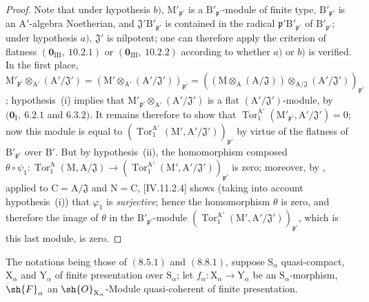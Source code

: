 \begin{proof}
Note that under hypothesis $b)$, $\mathrm{M}'_{\mathfrak{p}'}$ is a $\mathrm{B}'_{\mathfrak{p}'}$-module of finite type, $\mathrm{B}'_{\mathfrak{p}'}$ is an $\mathrm{A}'$-algebra Noetherian, and $\mathfrak{J}'\mathrm{B}'_{\mathfrak{p}'}$ is contained in the radical $\mathfrak{p}'\mathrm{B}'_{\mathfrak{p}'}$ of $\mathrm{B}'_{\mathfrak{p}'}$; under hypothesis $a)$, $\mathfrak{J}'$ is nilpotent; one can therefore apply the criterion of flatness $(\mathbf{0}_{\mathrm{III}},~10.2.1)$ or $(\mathbf{0}_{\mathrm{III}},~10.2.2)$ according to whether $a)$ or $b)$ is verified. In the first place, $\mathrm{M}'_{\mathfrak{p}'}\otimes_{\mathrm{A}'}(\mathrm{A}'/\mathfrak{J}')=(\mathrm{M}'\otimes_{\mathrm{A}'}(\mathrm{A}'/\mathfrak{J}'))_{\mathfrak{p}'}=((\mathrm{M}\otimes_\mathrm{A}(\mathrm{A}/\mathfrak{J}))\otimes_{\mathrm{A}/\mathfrak{J}}(\mathrm{A}'/\mathfrak{J}'))_{\mathfrak{p}'}$; hypothesis~(i) implies that $\mathrm{M}'_{\mathfrak{p}'}\otimes_{\mathrm{A}'}(\mathrm{A}'/\mathfrak{J}')$ is a flat $(\mathrm{A}'/\mathfrak{J}')$-module, by $(\mathbf{0}_\mathrm{I},~6.2.1$ and $6.3.2)$. It remains therefore to show that $\operatorname{Tor}_1^{\mathrm{A}'}(\mathrm{M}'_{\mathfrak{p}'},\mathrm{A}'/\mathfrak{J}')=0$; now this module is equal to $(\operatorname{Tor}_1^{\mathrm{A}'}(\mathrm{M}',\mathrm{A}'/\mathfrak{J}'))_{\mathfrak{p}'}$ by virtue of the flatness of $\mathrm{B}'_{\mathfrak{p}'}$ over $\mathrm{B}'$. But by hypothesis~(ii), the homomorphism composed $\theta\circ\psi_1:\operatorname{Tor}_1^\mathrm{A}(\mathrm{M},\mathrm{A}/\mathfrak{J})\to(\operatorname{Tor}_1^{\mathrm{A}'}(\mathrm{M}',\mathrm{A}'/\mathfrak{J}'))_{\mathfrak{p}'}$ is zero; moreover, by , applied to $\mathrm{C}=\mathrm{A}/\mathfrak{J}$ and $\mathrm{N}=\mathrm{C}$, [IV.11.2.4] shows (taking into account hypothesis~(i)) that $\varphi_1$ is \emph{surjective}; hence the homomorphism $\theta$ is zero, and therefore the image of $\theta$ in the $\mathrm{B}'_{\mathfrak{p}'}$-module $(\operatorname{Tor}_1^{\mathrm{A}'}(\mathrm{M}',\mathrm{A}'/\mathfrak{J}'))_{\mathfrak{p}'}$, which is this last module, is zero.
\end{proof}

\begin{theorem}[11.2.6]
\label{IV.11.2.6}
The notations being those of $(8.5.1)$ and $(8.8.1)$, suppose $\mathrm{S}_\alpha$ quasi-compact, $\mathrm{X}_\alpha$ and $\mathrm{Y}_\alpha$ of finite presentation over $\mathrm{S}_\alpha$; let $f_\alpha:\mathrm{X}_\alpha\to\mathrm{Y}_\alpha$ be an $\mathrm{S}_\alpha$-morphism, $\sh{F}_\alpha$ an $\sh{O}_{\mathrm{X}_\alpha}$-Module quasi-coherent of finite presentation.
\end{theorem}

